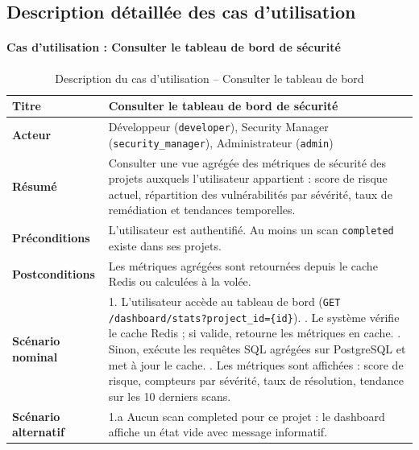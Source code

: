 \subsection{Description détaillée des cas d'utilisation}

\paragraph{Cas d'utilisation : Consulter le tableau de bord de sécurité}
\begin{table}[H]
\centering
\caption{Description du cas d'utilisation -- Consulter le tableau de bord}
\label{tab:uc-dashboard}
\small
\renewcommand{\arraystretch}{1.3}
\begin{tabularx}{\textwidth}{>{\bfseries}p{3.5cm} X}
\hline
Titre & Consulter le tableau de bord de sécurité \\
\hline
Acteur & Développeur (\texttt{developer}), Security Manager (\texttt{security\_manager}), Administrateur (\texttt{admin}) \\
\hline
Résumé & Consulter une vue agrégée des métriques de sécurité des projets auxquels l'utilisateur appartient : score de risque actuel, répartition des vulnérabilités par sévérité, taux de remédiation et tendances temporelles. \\
\hline
Préconditions & L'utilisateur est authentifié. Au moins un scan \texttt{completed} existe dans ses projets. \\
\hline
Postconditions & Les métriques agrégées sont retournées depuis le cache Redis ou calculées à la volée. \\
\hline
Scénario nominal &
1. L'utilisateur accède au tableau de bord (\texttt{GET /dashboard/stats?project\_id=\{id\}}). \newline
2. Le système vérifie le cache Redis ; si valide, retourne les métriques en cache. \newline
3. Sinon, exécute les requêtes SQL agrégées sur PostgreSQL et met à jour le cache. \newline
4. Les métriques sont affichées : score de risque, compteurs par sévérité, taux de résolution, tendance sur les 10 derniers scans. \\
\hline
Scénario alternatif &
1.a Aucun scan completed pour ce projet : le dashboard affiche un état vide avec message informatif. \\
\hline
\end{tabularx}
\end{table}

